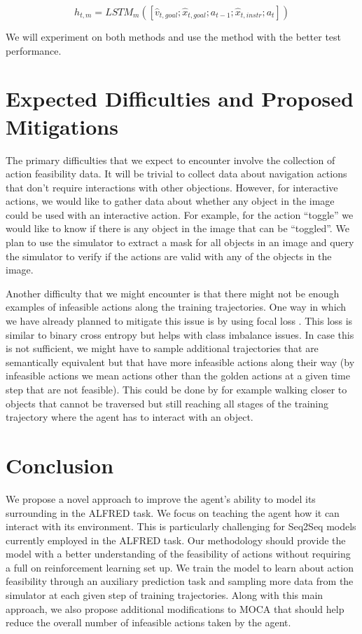 \documentclass[11pt,a4paper]{article}
\begin{document}
\begin{equation}

    h_{t,m} = LSTM_{m}([\hat{v}_{t,goal};\hat{x}_{t,goal};a_{t-1};\hat{x}_{t,instr};a_{t}])

\end{equation}

We will experiment on both methods and use the method with the better test performance.

\section{Expected Difficulties and Proposed Mitigations}
The primary difficulties that we expect to encounter involve the collection of action feasibility data. It will be trivial to collect data about navigation actions that don't require interactions with other objections. However, for interactive actions, we would like to gather data about whether any object in the image could be used with an interactive action. For example, for the action ``toggle'' we would like to know if there is any object in the image that can be ``toggled''. We plan to use the simulator to extract a mask for all objects in an image and query the simulator to verify if the actions are valid with any of the objects in the image.

Another difficulty that we might encounter is that there might not be enough examples of infeasible actions along the training trajectories. One way in which we have already planned to mitigate this issue is by using focal loss \cite{lin2017focal}. This loss is similar to binary cross entropy but helps with class imbalance issues. In case this is not sufficient, we might have to sample additional trajectories that are semantically equivalent but that have more infeasible actions along their way (by infeasible actions we mean actions other than the golden actions at a given time step that are not feasible). This could be done by for example walking closer to objects that cannot be traversed but still reaching all stages of the training trajectory where the agent has to interact with an object.

\section{Conclusion}
We propose a novel approach to improve the agent's ability to model its surrounding in the ALFRED task. We focus on teaching the agent how it can interact with its environment. This is particularly challenging for Seq2Seq models currently employed in the ALFRED task. Our methodology should provide the model with a better understanding of the feasibility of actions without requiring a full on reinforcement learning set up. We train the model to learn about action feasibility through an auxiliary prediction task and sampling more data from the simulator at each given step of training trajectories. Along with this main approach, we also propose additional modifications to MOCA that should help reduce the overall number of infeasible actions taken by the agent. 



\clearpage



\end{document}
